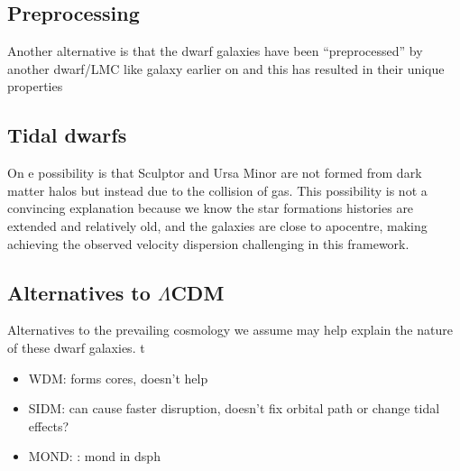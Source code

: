 \subsection{Preprocessing}\label{preprocessing}

Another alternative is that the dwarf galaxies have been
``preprocessed'' by another dwarf/LMC like galaxy earlier on and this
has resulted in their unique properties

\subsection{Tidal dwarfs}\label{tidal-dwarfs}

On e possibility is that Sculptor and Ursa Minor are not formed from
dark matter halos but instead due to the collision of gas. This
possibility is not a convincing explanation because we know the star
formations histories are extended and relatively old, and the galaxies
are close to apocentre, making achieving the observed velocity
dispersion challenging in this framework.

\subsection{\texorpdfstring{Alternatives to
\(\Lambda\)CDM}{Alternatives to \textbackslash LambdaCDM}}\label{alternatives-to-lambdacdm}

Alternatives to the prevailing cosmology we assume may help explain the
nature of these dwarf galaxies. t

\begin{itemize}
\tightlist
\item
  WDM: forms cores, doesn't help
\item
  SIDM: can cause faster disruption, doesn't fix orbital path or change
  tidal effects?
\item
  MOND: \citet{sanchez-salcedo+hernandez2007}: mond in dsph
\end{itemize}
